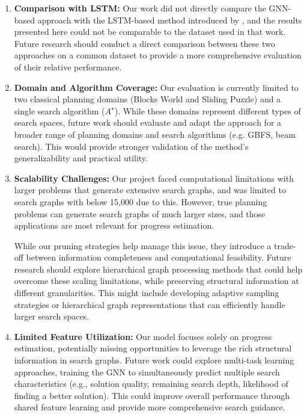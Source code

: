 \documentclass[letterpaper]{article}
\begin{document}
\begin{enumerate}
    \item \textbf{Comparison with LSTM:} Our work did not directly compare the GNN-based approach with the LSTM-based method introduced by \citet{sudry2022learning}, and the results presented here could not be comparable to the dataset used in that work. Future research should conduct a direct comparison between these two approaches on a common dataset to provide a more comprehensive evaluation of their relative performance.

    \item \textbf{Domain and Algorithm Coverage:} Our evaluation is currently limited to two classical planning domains (Blocks World and Sliding Puzzle) and a single search algorithm ($A^{\star}$). While these domains represent different types of search spaces, future work should evaluate and adapt the approach for a broader range of planning domains and search algorithms (e.g. GBFS, beam search). This would provide stronger validation of the method's generalizability and practical utility.

    \item \textbf{Scalability Challenges:} Our project faced computational limitations with larger problems that generate extensive search graphs, and was limited to search graphs with below 15,000 due to this. However, true planning problems can generate search graphs of much larger sizes, and those applications are most relevant for progress estimation.

    While our pruning strategies help manage this issue, they introduce a trade-off between information completeness and computational feasibility. Future research should explore hierarchical graph processing methods that could help overcome these scaling limitations, while preserving structural information at different granularities. This might include developing adaptive sampling strategies or hierarchical graph representations that can efficiently handle larger search spaces.

    \item \textbf{Limited Feature Utilization:} Our model focuses solely on progress estimation, potentially missing opportunities to leverage the rich structural information in search graphs. Future work could explore multi-task learning approaches, training the GNN to simultaneously predict multiple search characteristics (e.g., solution quality, remaining search depth, likelihood of finding a better solution). This could improve overall performance through shared feature learning and provide more comprehensive search guidance.
\end{enumerate}
\end{document}
